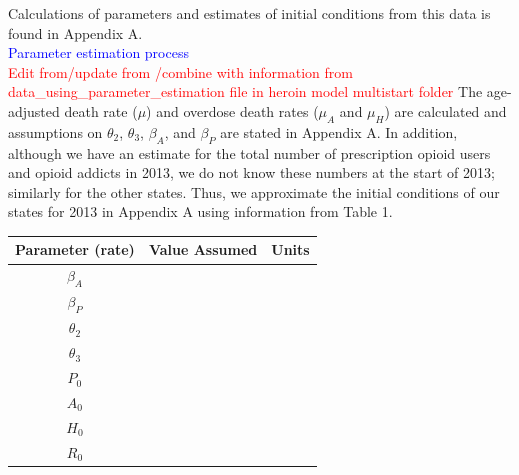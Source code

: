 \documentclass[12pt]{article}
\begin{document}
Calculations of parameters and estimates of initial conditions from this data is found in Appendix A. \\



\textcolor{blue}{Parameter estimation process} \\
\textcolor{red}{Edit from/update from /combine with information from data\_using\_parameter\_estimation file in heroin model multistart folder}
The age-adjusted death rate ($\mu$) and overdose death rates ($\mu_{A}$ and $\mu_{H}$) are calculated and assumptions on $\theta_2$, $\theta_3$, $\beta_A$, and $\beta_P$ are stated in Appendix A. In addition, although we have an estimate for the total number of prescription opioid users and opioid addicts in 2013, we do not know these numbers at the start of 2013; similarly for the other states. Thus, we approximate the initial conditions of our states for 2013 in Appendix A using information from Table 1. 

\begin{center}

\begin{tabular}{|c | c | c|}

 \hline

{Parameter (rate)} & {Value Assumed} & {Units} \\ [0.5ex]

 \hline\hline

$\beta_A$ &  &  \\

\hline

$\beta_P$&  &  \\

\hline

$\theta_2$ &  &  \\

\hline

$\theta_3$ &  &  \\

\hline


$P_0$ &  &  \\

\hline

$A_0$ &  &  \\

\hline

$H_0$ &  &  \\

\hline

$R_0$ &  &  \\

\hline
\end{tabular}

\end{center}
 
\end{document}
